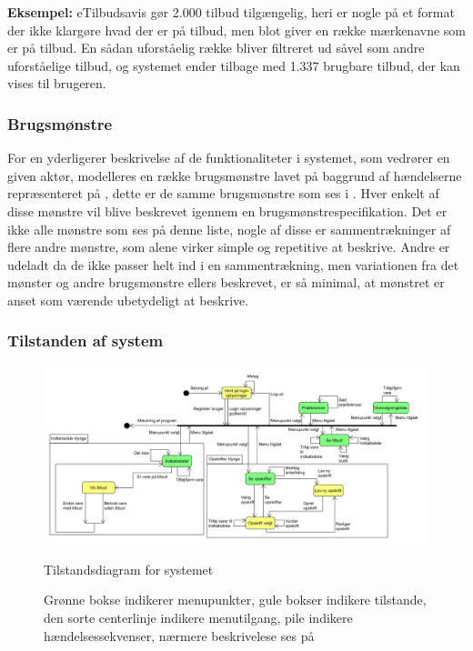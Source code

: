 \textbf{Eksempel:} eTilbudsavis gør 2.000 tilbud tilgængelig, heri er nogle på et format der ikke klargøre hvad der er på tilbud, men blot giver en række mærkenavne som er på tilbud.
En sådan uforståelig række bliver filtreret ud såvel som andre uforståelige tilbud, og systemet ender tilbage med 1.337 brugbare tilbud, der kan vises til brugeren. 

\subsubsection*{Brugsmønstre}
For en yderligerer beskrivelse af de funktionaliteter i systemet, som vedrører en given aktør, modelleres en række brugsmønstre lavet på baggrund af hændelserne repræsenteret på , dette er de samme brugsmønstre som ses i .
Hver enkelt af disse mønstre vil blive beskrevet igennem en brugsmønstrespecifikation.
Det er ikke alle mønstre som ses på denne liste, nogle af disse er sammentrækninger af flere andre mønstre, som alene virker simple og repetitive at beskrive.
Andre er udeladt da de ikke passer helt ind i en sammentrækning, men variationen fra det mønster og andre brugsmønstre ellers beskrevet, er så minimal, at mønstret er anset som værende ubetydeligt at beskrive.



\subsubsection*{Tilstanden af system}
\begin{figure}
	\centering
	\includegraphics[scale=0.6, angle=90]{images/Diagrams/Tilstandsdiagram.PNG}
	\caption{Tilstandsdiagram for systemet}
	\caption{Grønne bokse indikerer menupunkter, gule bokser indikere tilstande, den sorte centerlinje indikere menutilgang, pile indikere hændelsessekvenser, nærmere beskrivelese ses på }\label{tilstandsdiagram}
\end{figure}

